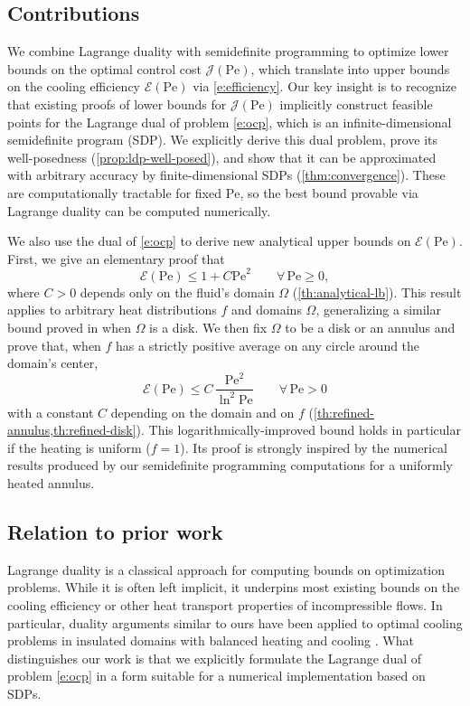 \documentclass[a4paper, 10pt]{amsart}
\numberwithin{equation}{section}
\theoremstyle{plain}
\theoremstyle{definition}
\theoremstyle{remark}
\newcommand{\Pe}{\mathrm{Pe}}
\newcommand{\ocpval}{\mathcal{J}}
\newcommand{\efficiency}{\mathcal{E}}
\begin{document}
\subsection{Contributions}
We combine Lagrange duality with semidefinite programming to optimize lower bounds on the optimal control cost $\ocpval(\Pe)$, which translate into upper bounds on the cooling efficiency $\efficiency(\Pe)$ via \cref{e:efficiency}. Our key insight is to recognize that existing proofs of lower bounds for $\ocpval(\Pe)$ implicitly construct feasible points for the Lagrange dual of problem \cref{e:ocp}, which is an infinite-dimensional semidefinite program (SDP). We explicitly derive this dual problem, prove its well-posedness (\cref{prop:ldp-well-posed}), and show that it can be approximated with arbitrary accuracy by finite-dimensional SDPs (\cref{thm:convergence}). These are computationally tractable for fixed $\Pe$, so the best bound provable via Lagrange duality can be computed numerically.

We also use the dual of \cref{e:ocp} to derive new analytical upper bounds on $\efficiency(\Pe)$. First, we give an elementary proof that
\begin{equation}\label{e:an-bound-intro}
    \efficiency(\Pe) \leq 1 + C \Pe^2
    \qquad \forall\, \Pe \geq 0,
\end{equation}
where $C>0$ depends only on the fluid's domain $\Omega$ (\cref{th:analytical-lb}). This result applies to arbitrary heat distributions $f$ and domains $\Omega$, generalizing a similar bound proved in \cite{Tobasco2022} when $\Omega$ is a disk. 
We then fix $\Omega$ to be a disk or an annulus and prove that, when $f$ has a strictly positive average on any circle around the domain's center,
\begin{equation}\label{e:intro-log-lb}
    \efficiency(\Pe) \leq C \, \frac{\Pe^2}{\ln^2 \Pe}
    \qquad \forall\, \Pe > 0
\end{equation}
with a constant $C$ depending on the domain and on $f$ (\cref{th:refined-annulus,th:refined-disk}). This logarithmically-improved bound holds in particular if the heating is uniform ($f=1$). Its proof is strongly inspired by the numerical results produced by our semidefinite programming computations for a uniformly heated annulus.

\subsection{Relation to prior work}
Lagrange duality is a classical approach for computing bounds on optimization problems. While it is often left implicit, it underpins most existing bounds on the cooling efficiency or other heat transport properties of incompressible flows. In particular, duality arguments similar to ours have been applied to optimal cooling problems in insulated domains with balanced heating and cooling \cite{Song2023}. What distinguishes our work is that we explicitly formulate the Lagrange dual of problem \cref{e:ocp} in a form suitable for a numerical implementation based on SDPs.
\end{document}
